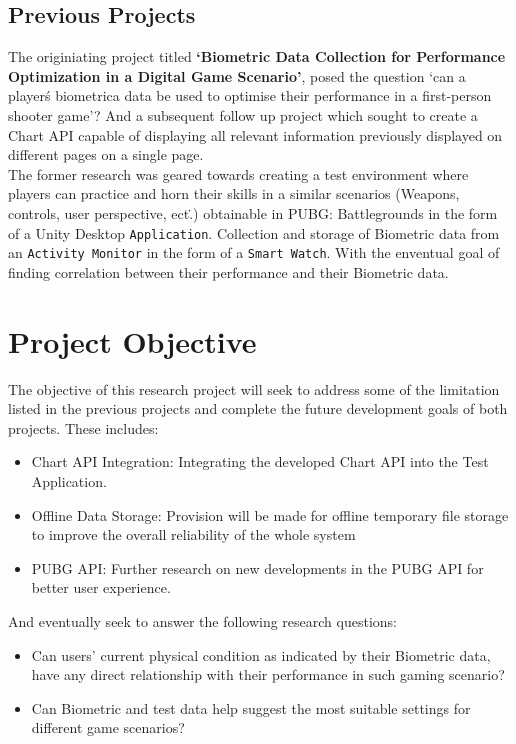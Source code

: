 \documentclass{report}
\begin{document}
    \subsection*{Previous Projects}
    The originiating project titled \textbf{`Biometric Data Collection for Performance Optimization in a Digital
    Game Scenario'}, posed the question `can a player\'s biometrica data be used to optimise their performance in a 
    first-person shooter game'? And a subsequent follow up project which sought to create a Chart API capable of displaying 
    all relevant information previously displayed on different pages on a single page.\\
    The former research was geared towards creating a test environment where players can 
    practice and horn their skills in a similar scenarios (Weapons, controls, user perspective, ect\..) obtainable in PUBG\:: 
    Battlegrounds in the form of a Unity Desktop {\tt Application}. Collection and storage of Biometric data from an 
    {\tt Activity Monitor} in the form of a {\tt Smart Watch}. With the enventual goal of finding correlation between their
    performance and their Biometric data. 
    \\

    
    \section*{Project Objective}
        The objective of this research project will seek to address some of the limitation listed in the previous projects and
        complete the future development goals of both projects. 
        These includes\::
        \begin{itemize}
            \item{Chart API Integration}: Integrating the developed Chart API into the Test Application.
            \item {Offline Data Storage}: Provision will be made for offline temporary file storage to improve the overall 
            reliability of the whole system
            \item{PUBG API}: Further research on new developments in the PUBG API for better user experience. 
        \end{itemize} 
        
        And eventually seek to answer the following research questions\::

        \begin{itemize}
            \item {Can users' current physical condition as indicated by their Biometric data, have any direct relationship with 
            their performance in such gaming scenario?}
            \item {Can Biometric and test data help suggest the most suitable settings for different game scenarios?}
        \end{itemize}
\end{document}

